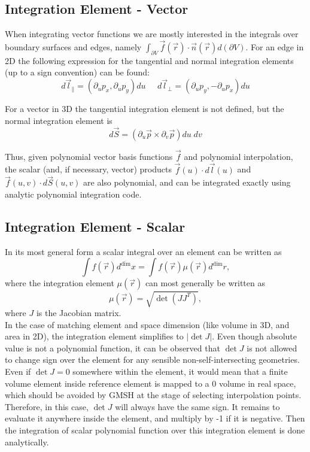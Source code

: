 \subsection{Integration Element - Vector}

When integrating vector functions we are mostly interested in the integrals over boundary surfaces and edges, namely $\int_{\partial V} \vec{f}(\vec{r}) \cdot \vec{n}(\vec{r}) d(\partial V)$. For an edge in 2D the following expression for the tangential and normal integration elements (up to a sign convention) can be found:
\[ d\vec{l}_{\parallel} = (\partial_u p_x, \partial_u p_y)du \; \; \; \; \; d\vec{l}_{\perp} = (\partial_u p_y, -\partial_u p_x)du  \]

\noindent
For a vector in 3D the tangential integration element is not defined, but the normal integration element is
\[ d\vec{S} = (\partial_u \vec{p} \times \partial_v \vec{p})du \; dv  \]

\noindent
Thus, given polynomial vector basis functions $\vec{f}$ and polynomial interpolation, the scalar (and, if necessary, vector) products $\vec{f}(u) \cdot d\vec{l}(u)$ and $\vec{f}(u,v) \cdot d\vec{S}(u,v)$ are also polynomial, and can be integrated exactly using analytic polynomial integration code.




\subsection{Integration Element - Scalar}

In its most general form a scalar integral over an element can be written as \[\int f(\vec{r}) d^{\dim} x = \int f(\vec{r}) \mu(\vec{r}) d^{\dim} r,\] where the integration element $\mu(\vec{r})$ can most generally be written as \[\mu(\vec{r}) = \sqrt{\det(J J^T)},\] where $J$ is the Jacobian matrix. \\

\noindent
In the case of matching element and space dimension (like volume in 3D, and area in 2D), the integration element simplifies to $|\det J|$. Even though absolute value is not a polynomial function, it can be observed that $\det J$ is not allowed to change sign over the element for any sensible non-self-intersecting geometries. Even if $\det J = 0$ somewhere within the element, it would mean that a finite volume element inside reference element is mapped to a 0 volume in real space, which should be avoided by GMSH at the stage of selecting interpolation points. Therefore, in this case, $\det J$ will always have the same sign. It remains to evaluate it anywhere inside the element, and multiply by -1 if it is negative. Then the integration of scalar polynomial function over this integration element is done analytically. \\

